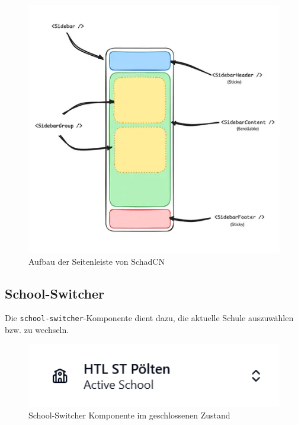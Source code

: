 \begin{inhalt}
\begin{enumerate}[label=\textbf{\arabic*.}]
\begin{figure}[!htb]
\centering
\includegraphics[width=1\textwidth]{files/Thomas/pics/Website/Sidebar/sidebar-aufbau.png}
\caption[Aufbau der Seitenleiste von SchadCN \cite{SchadCNSeitenleiste}]{Aufbau der Seitenleiste von SchadCN \cite{SchadCNSeitenleiste}}
\label{fig:gehaeuse_internet_bild}
\end{figure}

\newpage

\subsection{School-Switcher}

Die \texttt{school-switcher}-Komponente dient dazu, die aktuelle Schule auszuwählen bzw. zu wechseln.

\begin{figure}[!htb]
\centering
\includegraphics[width=1\textwidth]{files/Thomas/pics/Website/Sidebar/school-switcher/school-switcher.png}
\caption[School-Switcher Komponente geschlossen]{School-Switcher Komponente im geschlossenen Zustand}
\label{fig:school_switcher_closed}
\end{figure}


\end{enumerate}
\end{inhalt}
